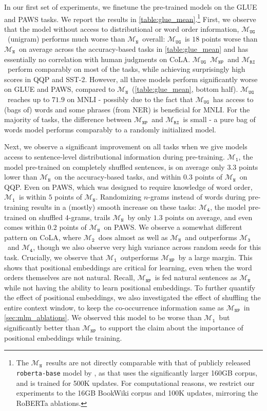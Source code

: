 \documentclass[letterpaper, 12pt]{report}
\newcommand{\OR}{$\mathcal{M}_{\texttt{N}}$}
\newcommand{\RI}{$\mathcal{M}_{\texttt{1}}$}
\newcommand{\RII}{$\mathcal{M}_{\texttt{2}}$}
\newcommand{\RIII}{$\mathcal{M}_{\texttt{3}}$}
\newcommand{\RIV}{$\mathcal{M}_{\texttt{4}}$}
\newcommand{\RC}{$\mathcal{M}_{\texttt{UG}}$}
\newcommand{\RT}{$\mathcal{M}_{\texttt{RI}}$}
\newcommand{\NP}{$\mathcal{M}_{\texttt{NP}}$}
\begin{document}
In our first set of experiments, we finetune the pre-trained models
on the GLUE and PAWS tasks.
We report the results in \autoref{table:glue_mean}.\footnote{The \OR\ results are not directly comparable with that of publicly released \texttt{roberta-base} model by \citet{liu-et-al-2019-roberta}, as that uses the significantly larger 160GB corpus, and is trained for 500K updates. For computational reasons, we restrict our experiments to the 16GB BookWiki corpus and 100K updates, mirroring the RoBERTa ablations.}
First, we observe that the model without access to distributional or word order information, \RC\ (unigram) performs much worse than \OR\ overall:
\RC\ is $18$ points worse than \OR\ on average across the accuracy-based tasks in \autoref{table:glue_mean} and has essentially no correlation with human judgments on CoLA. \RC\, \NP\ and \RT\ perform comparably on most of the tasks, while achieving surprisingly high scores in QQP and SST-2. However, all three models perform significantly worse on GLUE and PAWS, compared to \OR\ (\autoref{table:glue_mean}, bottom half).
\RC\ reaches up to $71.9$ on MNLI - possibly due to the fact that \RC\ has access to (bags of) words and some phrases (from NER) is beneficial for MNLI. For the majority of tasks, the difference between \NP\ and \RT\ is small - a pure bag of words model performs comparably to a randomly initialized model.

Next, we observe a significant improvement on all tasks when we give models access to sentence-level distributional information during pre-training.
\RI, the model pre-trained on completely shuffled sentences, is on average only $3.3$ points lower than \OR\ on the accuracy-based tasks,
and within $0.3$ points of \OR\ on QQP.
Even on PAWS, which was designed to require knowledge of word order, \RI\ is within $5$ points of \OR.
Randomizing $n$-grams instead of words during pre-training results in a (mostly) smooth increase on these tasks: \RIV, the model pre-trained on shuffled $4$-grams, trails \OR\ by only $1.3$ points on average, and even comes within $0.2$ points of \OR\ on PAWS.
We observe a somewhat different pattern on CoLA, where \RII\ does almost as well as \OR\ and outperforms \RIII\ and \RIV, though we also observe very high variance across random seeds for this task.
Crucially, we observe that \RI\ outperforms \NP\ by a large margin. This shows that positional embeddings are critical for learning, even when the word orders themselves are not natural. Recall, \NP\ is fed natural sentences as \OR\, while not having the ability to learn positional embeddings. To further quantify the effect of positional embeddings, we also investigated the effect of shuffling the entire context window, to keep the co-occurrence information same as \NP\ in \autoref{sec:mlm_ablations}. We observed this model to be worse than \RI\, but significantly better than \NP\, to support the claim about the importance of positional embeddings while training.
\end{document}
